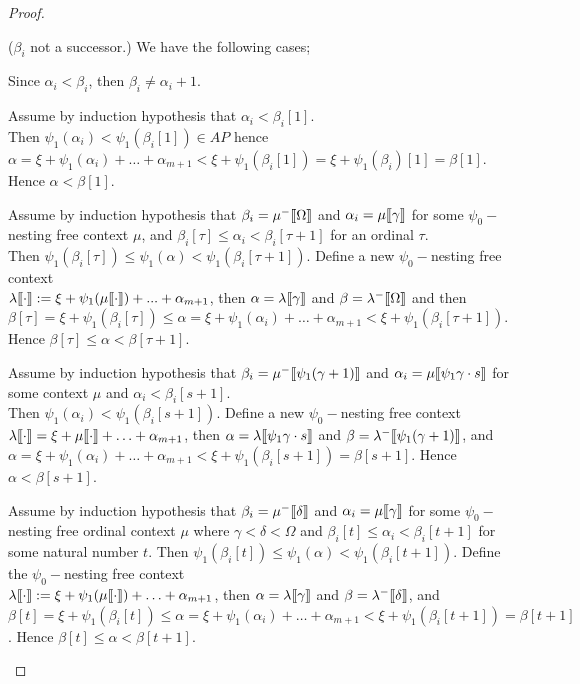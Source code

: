 \documentclass{amsart}
\theoremstyle{plain}
\theoremstyle{plain}
\def\scbrl{[\hspace{-.14em}[}
\def\scbrr{]\hspace{-.14em}]}
\def\scbr#1{\scbrl#1\scbrr}
\newcommand{\Om}{{\Omega}}
\newcommand{\al}{{\alpha}}
\newcommand{\be}{{\beta}}
\newcommand{\ga}{\gamma}
\newcommand{\de}{\delta}
\newcommand{\la}{\lambda}
\def\scbrl{[\hspace{-.14em}[}
\def\scbrr{]\hspace{-.14em}]}
\def\scbr#1{\scbrl#1\scbrr}
\begin{document}
\begin{proof}
\begin{Cases}
    \smallskip
    \item ($\be_i$ not a successor.)
    We have the following cases;
    \begin{Cases}
        \item Since $\al_i<\be_i$, then $\be_i \neq \al_i+1$.\medskip
        
        
        \item Assume by induction hypothesis that $\al_i<\be_i[1]$.\\
        Then $\psi_1(\al_i) < \psi_1(\be_i[1]) \in AP$ hence %
        $\al = \xi + \psi_1(\al_i) + \ldots + \al_{m+1} < \xi + \psi_1(\be_i[1]) = \xi+ \psi_1(\be_i)[1]  = \be[1]$.
        Hence $ \al< \be[1]$.
        \medskip
        
        \item Assume by induction hypothesis that  $\be_i = \mu^-\scbr{\Om}$ and $\al_i= \mu\scbr{\ga}$ for some $\psi_0-$nesting free context $\mu$, and $\be_i[\tau] \leq \al_i < \be_i[\tau+1]$ for an ordinal $\tau$.\\	
        Then $\psi_1(\be_i[\tau]) \leq \psi_1(\al) <\psi_1(\be_i[\tau+1])$.
        Define a new $\psi_0-$nesting free context\\
        $\la\scbr{\cdot} := \xi+ \psi_1(\mu\scbr{\cdot}) +...+ {\al_{m+1}}$, then  $\al = \la\scbr{\ga}$ and $\be = \la^-\scbr{\Om}$ and 
        then $\be[\tau]= \xi + \psi_1(\be_i[\tau])\leq \al = \xi + \psi_1(\al_i)+\ldots+ \al_{m+1} < \xi + \psi_1(\be_i[\tau+1])$.
        Hence $\be[\tau] \leq \al < \be[\tau+1]$.
        \medskip
        
        \item Assume by induction hypothesis that $\be_i=\mu^-\scbr{\psi_1(\ga+1)}$ and $\al_i= \mu\scbr{\psi_1\ga \cdot s}$  for some context $\mu$ and $\al_i<\be_i[s+1]$.\\
        Then $\psi_1(\al_i) <\psi_1(\be_i[s+1])$.
        Define a new $\psi_0-$nesting free context\\
        $\la\scbr{\cdot} = \xi + \mu\scbr{\cdot} +\ldots + {\al_{m+1}}$, then $\al = \la\scbr{\psi_1\ga \cdot s}$ and $\be = \la^-\scbr{ \psi_1(\ga+1)}$, 
        and $\al= \xi + \psi_1(\al_i)+\ldots+\al_{m+1}<\xi + \psi_1(\be_i[s+1])=\be[s+1]$.
        Hence $\al < \be[s+1]$.		
        \medskip
        
        \item  Assume by induction hypothesis that $\be_i=\mu^-\scbr{\de}$ and $\al_i= \mu\scbr{\ga}$ for some $\psi_0-$nesting free ordinal context $\mu$ where $\ga<\de<\Om$ and $\be_i[t]\leq \al_i < \be_i[t+1]$ for some natural number $t$.
        Then $\psi_1(\be_i[t]) \leq \psi_1(\al) < \psi_1(\be_i[t+1])$.
        Define the $\psi_0-$nesting free context\\
        $\la\scbr{\cdot} := \xi+ \psi_1(\mu\scbr{\cdot}) + \ldots+ {\al_{m+1}}$, then  $\al = \la\scbr{\ga}$ and $\be = \la^-\scbr{\de}$, 
        and $\be[t] = \xi + \psi_1(\be_i[t])\leq \al = \xi + \psi_1(\al_i) +\ldots+\al_{m+1} < \xi+\psi_1(\be_i[t+1])=\be[t+1]$.
        Hence  $\be[t] \leq \al < \be[t+1]$.
        

\end{Cases}
\end{Cases}
\end{proof}
\end{document}
